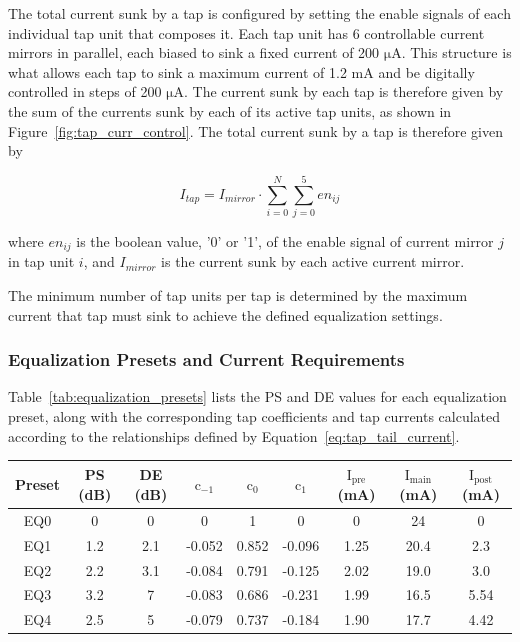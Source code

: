 The total current sunk by a tap is configured by setting the enable signals of each individual tap unit that composes it. Each tap unit has 6 controllable current mirrors in parallel, each biased to sink a fixed current of 200 $\mathrm{\mu A}$. This structure is what allows each tap to sink a maximum current of 1.2 mA and be digitally controlled in steps of 200 $\mathrm{\mu A}$. The current sunk by each tap is therefore given by the sum of the currents sunk by each of its active tap units, as shown in Figure~\ref{fig:tap_curr_control}. The total current sunk by a tap is therefore given by

\begin{equation}
I_{tap} = I_{mirror} \cdot \sum_{i=0}^{N} \sum_{j=0}^{5} en_{ij} 
\end{equation}

where $en_{ij}$ is the boolean value, '0' or '1', of the enable signal of current mirror $j$ in tap unit $i$, and $I_{mirror}$ is the current sunk by each active current mirror. 

The minimum number of tap units per tap is determined by the maximum current that tap must sink to achieve the defined equalization settings.

\subsubsection{Equalization Presets and Current Requirements} \label{sec:eq_presets_current}

Table~\ref{tab:equalization_presets} lists the \ac{PS} and \ac{DE} values for each equalization preset, along with the corresponding tap coefficients and tap currents calculated according to the relationships defined by Equation~\eqref{eq:tap_tail_current}.

\begin{center}
	\label{tab:equalization_presets}
	\begin{tabular}{ccccccccc}
		\hline \hline	
		\textbf{Preset} & \textbf{PS (dB)} & \textbf{DE (dB)} & \textbf{$\mathrm{c_{-1}}$} & \textbf{$\mathrm{c_0}$} & \textbf{$\mathrm{c_1}$} & \textbf{$\mathrm{I_{pre}}$ (mA)} & \textbf{$\mathrm{I_{main}}$ (mA)} & \textbf{$\mathrm{I_{post}}$ (mA)}\\
		\hline
		EQ0 & 0 & 0 & 0 & 1 & 0 & 0 & 24 & 0 \\
		EQ1 & 1.2 & 2.1 & -0.052 & 0.852 & -0.096 & 1.25 & 20.4 & 2.3 \\
		EQ2 & 2.2 & 3.1 & -0.084 & 0.791 & -0.125 & 2.02 & 19.0 & 3.0 \\
		EQ3 & 3.2 & 7 & -0.083 & 0.686 & -0.231 & 1.99 & 16.5 & 5.54 \\
		EQ4 & 2.5 & 5 & -0.079 & 0.737 & -0.184 & 1.90 & 17.7 & 4.42 \\
		\hline \hline
	\end{tabular}
\end{center}

